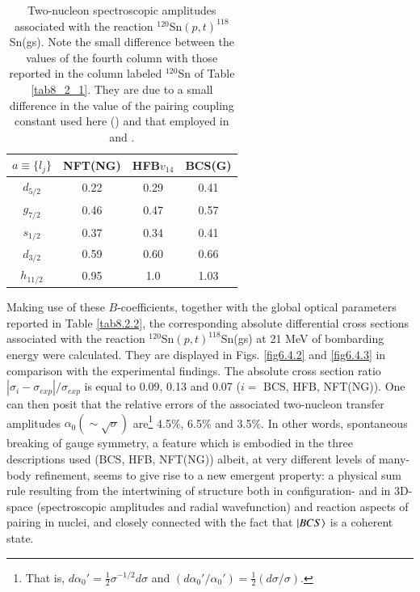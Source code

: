 \begin{table}
\begin{center}
\begin{tabular}{|c|c|c|c|}
\hline
$a\equiv\{l_j\}$ & NFT(NG)  & HFB$v_{14}$  & BCS(G)  \\ 
 \hline 
$d_{5/2}$ & 0.22 & 0.29 & 0.41 \\ 
\hline 
$g_{7/2}$ & 0.46 & 0.47 &  0.57\\ 
 \hline
$s_{1/2}$ & 0.37 & 0.34 & 0.41 \\ 
 \hline
$d_{3/2}$ & 0.59 & 0.60 & 0.66 \\ 
 \hline
$h_{11/2}$ & 0.95 & 1.0 & 1.03\\
 \hline
\end{tabular}
\end{center}
\caption{Two-nucleon spectroscopic amplitudes associated with the reaction $^{120}$Sn$(p,t)^{118}$Sn(gs). Note the small difference between the values of the fourth column with those reported in the column labeled $^{120}$Sn of Table \ref{tab8_2_1}. They are due to a small difference in the value of the pairing coupling constant used here  (\cite{Potel:17}) and that employed in \cite{Potel:17} and \cite{Potel:13b}. }\label{tab6.4.3}
\end{table} 
Making use of these $B$-coefficients, together with the global optical parameters reported in Table \ref{tab8.2.2}, the corresponding absolute differential cross sections associated with the reaction $^{120}$Sn$(p,t)^{118}$Sn(gs) at 21 MeV of bombarding energy were calculated.  They are displayed in Figs. \ref{fig6.4.2} and \ref{fig6.4.3} in comparison with the experimental findings.  The absolute cross section ratio $|\sigma_i-\sigma_{exp}|/\sigma_{exp}$ is equal to 0.09, 0.13 and 0.07 ($i=$ BCS, HFB, NFT(NG)). One can then posit that the relative errors of the associated two-nucleon transfer amplitudes $\alpha_0(\sim\sqrt{\sigma})$ are\footnote{That is, $d\alpha_0'=\tfrac{1}{2}\sigma^{-1/2}d\sigma$ and $(d\alpha_0'/\alpha_0')=\tfrac{1}{2}(d\sigma/\sigma)$.} 4.5\%, 6.5\% and 3.5\%. In other words, spontaneous breaking of gauge symmetry, a feature which is embodied in the three descriptions used (BCS, HFB, NFT(NG)) albeit, at very different levels of many-body refinement, seems to give rise to a new emergent property: a physical sum rule resulting from the intertwining of structure both in configuration- and in 3D-space (spectroscopic amplitudes and radial wavefunction) and reaction aspects of pairing in nuclei, and closely connected with the fact that $|{BCS} \rangle$ is a coherent state. 

